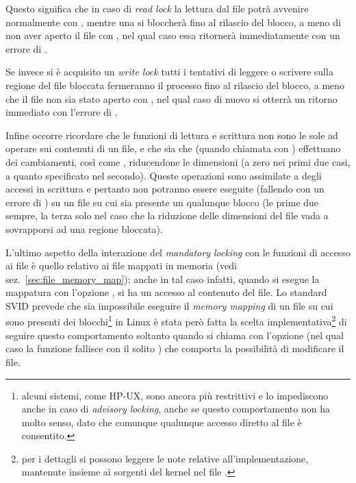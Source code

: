 Questo significa che in caso di \textit{read lock} la lettura dal file potrà
avvenire normalmente con , mentre una  si bloccherà
fino al rilascio del blocco, a meno di non aver aperto il file con
, nel qual caso essa ritornerà immediatamente con un errore
di .

Se invece si è acquisito un \textit{write lock} tutti i tentativi di leggere o
scrivere sulla regione del file bloccata fermeranno il processo fino al
rilascio del blocco, a meno che il file non sia stato aperto con
, nel qual caso di nuovo si otterrà un ritorno immediato
con l'errore di .

Infine occorre ricordare che le funzioni di lettura e scrittura non sono le
sole ad operare sui contenuti di un file, e che sia  che
 (quando chiamata con ) effettuano dei cambiamenti,
così come , riducendone le dimensioni (a zero nei primi due
casi, a quanto specificato nel secondo). Queste operazioni sono assimilate a
degli accessi in scrittura e pertanto non potranno essere eseguite (fallendo
con un errore di ) su un file su cui sia presente un qualunque
blocco (le prime due sempre, la terza solo nel caso che la riduzione delle
dimensioni del file vada a sovrapporsi ad una regione bloccata).

L'ultimo aspetto della interazione del \textit{mandatory locking} con le
funzioni di accesso ai file è quello relativo ai file mappati in memoria (vedi
sez.~\ref{sec:file_memory_map}); anche in tal caso infatti, quando si esegue
la mappatura con l'opzione , si ha un accesso al contenuto
del file. Lo standard SVID prevede che sia impossibile eseguire il
\textit{memory mapping} di un file su cui sono presenti dei
blocchi\footnote{alcuni sistemi, come HP-UX, sono ancora più restrittivi e lo
  impediscono anche in caso di \textit{advisory locking}, anche se questo
  comportamento non ha molto senso, dato che comunque qualunque accesso
  diretto al file è consentito.} in Linux è stata però fatta la scelta
implementativa\footnote{per i dettagli si possono leggere le note relative
  all'implementazione, mantenute insieme ai sorgenti del kernel nel file
  .}  di seguire questo comportamento
soltanto quando si chiama  con l'opzione  (nel
qual caso la funzione fallisce con il solito ) che comporta la
possibilità di modificare il file.

